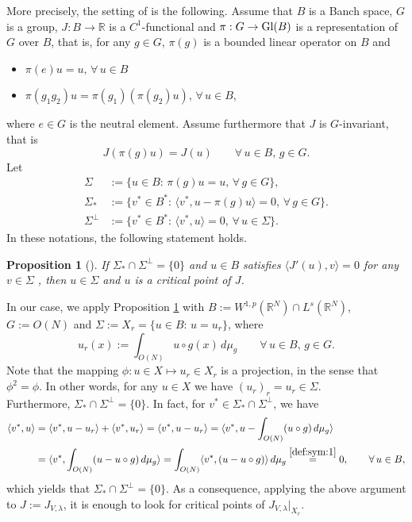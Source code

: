 \documentclass[11pt,reqno]{amsart}
\newtheorem{proposition}[theorem]{Proposition}
\theoremstyle{definition}
\numberwithin{equation}{section}
\numberwithin{theorem}{section}
\numberwithin{equation}{section}
\numberwithin{theorem}{section}
\newcommand{\R}{\mathbb{R}}
\begin{document}
More precisely, the setting of \cite{kobayashi2004principle} is the following. Assume that $B$ is a Banch space, $G$ is a group, $J:B\to\R$ is a $C^1$-functional and $\pi: G\to {\rm Gl}(B)$ is a representation of $G$ over $B$, that is, for any $g\in G$, $\pi(g)$ is a bounded linear operator on $B$ and
\begin{itemize}
    \item $\pi(e)u=u,\,\forall\,u\in B$
    \item $\pi(g_1 g_2)u=\pi(g_1)(\pi(g_2)u),\,\forall\,u\in B$,
\end{itemize}
where $e\in G$ is the neutral element. Assume furthermore that $J$ is $G$-invariant, that is $$J(\pi(g)u)=J(u)\qquad\forall\,u\in B,\,g\in G.$$ 
Let 
\begin{equation}\label{def:sym:1}
\begin{aligned}
\Sigma&:=\{u\in B:\,\pi(g)u=u,\,\forall\,g\in G\},\\
\Sigma_*&:=\{v^*\in B^*:\,\langle v^*,u-\pi(g)u\rangle=0,\,\forall\,g\in G\}.\\
\Sigma^\bot&:=\{v^*\in B^*:\,\langle v^*,u\rangle=0,\,\forall\,u\in\Sigma\}.
\end{aligned}
\end{equation}
In these notations, the following statement holds.
\begin{proposition}[\cite{kobayashi2004principle}]\label{prop-scp}
If $\Sigma_*\cap\Sigma^\bot=\{0\}$ and $u\in B$ satisfies $\langle J'(u),v\rangle=0$ for any $v\in \Sigma$ , then $u\in \Sigma$ and $u$ is a critical point of $J$.  
\end{proposition}
In our case, we apply Proposition \ref{prop-scp} with $B:=W^{1,p}(\R^N)\cap L^s(\R^N)$, $G:=O(N)$ and $\Sigma:=X_r=\{u\in B:\,u=u_r\}$, where
$$u_r(x):=\int_{O(N)} u\circ g(x)\,d\mu_g\qquad\forall\, u\in B,\,g\in G.$$
Note that the mapping $\phi:u\in X\mapsto u_r\in X_r$ is a projection, in the sense that $\phi^2=\phi$. In other words, for any $u\in X$ we have $(u_r)_r=u_r\in \Sigma$.\\ 

Furthermore, $\Sigma_*\cap\Sigma^\bot=\{0\}$. In fact, for $v^*\in\Sigma_*\cap\Sigma^\bot$, we have
\begin{equation}
\begin{aligned}
\langle v^*,u\rangle&=\langle v^*,u-u_r\rangle+\langle v^*,u_r\rangle=\langle v^*,u-u_r\rangle=\langle v^*,u-\int_{O(N)}(u\circ g) \,d\mu_g\rangle\\
&=\langle v^*,\int_{O(N)}(u-u\circ g) \,d\mu_g\rangle= \int_{O(N)}\langle v^*,(u-u\circ g)\rangle \,d\mu_g
\stackrel{\eqref{def:sym:1}}{=}0,\qquad\forall\, u\in B,
\end{aligned}
\end{equation}
which yields that $\Sigma_*\cap\Sigma^\bot=\{0\}$. As a consequence, applying the above argument to $J:=J_{V,\lambda}$, it is enough to look for critical points of $J_{V,\lambda}|_{X_r}$.
\end{document}
